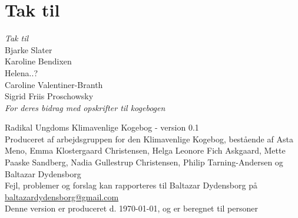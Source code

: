 \documentclass[11pt, a4paper]{article}
\begin{document}
\newpage

\section*{Tak til}
\textit{Tak til}\\

Bjarke Slater\\

Karoline Bendixen\\

Helena..?\\

Caroline Valentiner-Branth\\

Sigrid Friis Proschowsky\\

\textit{For deres bidrag med opskrifter til kogebogen}



	\newpage
	\centering Radikal Ungdoms Klimavenlige Kogebog - version 0.1\\
	Produceret af arbejdsgruppen for den Klimavenlige Kogebog, bestående af Asta Meno, Emma Klostergaard Christensen, Helga Leonore Fich Askgaard, Mette Paaske Sandberg, Nadia Gullestrup Christensen, Philip Tarning-Andersen og Baltazar Dydensborg\\
	Fejl, problemer og forslag kan rapporteres til Baltazar Dydensborg på \href{mailto:baltazardydensborg@gmail.com}{baltazardydensborg@gmail.com}\\
	Denne version er produceret d. \today, og er beregnet til \ruNumPersons{} personer
\end{document}
